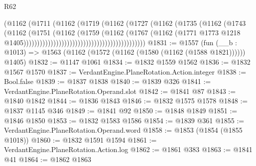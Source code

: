 \begin{lexlean}{R62}
\begin{coremodule}
                                                          (@1162
                                                            (@1711
                                                              (@1162
                                                                (@1719
                                                                  (@1162
                                                                    (@1727
                                                                      (@1162
                                                                        (@1735
                                                                          (@1162
                                                                            (@1743
                                                                              (@1162
                                                                                (@1751
                                                                                  (@1162
                                                                                    (@1759
                                                                                      (@1162
                                                                                        (@1767
                                                                                          (@1162
                                                                                            (@1771
                                                                                              @1773
                                                                                              @1218
                                                                                              @1405)))))))))))))))))))))))))))))))))))))))))))))
@1831 := @1557
    (fun (__b : @1013) => @1563 (@1162 (@1572 (@1162 (@1580 (@1162 (@1588 @1821)))))) @1405)
@1832 := @1147 @1061
@1834 := @1832 @1559 @1562
@1836 := @1832 @1567 @1570
@1837 := VerdantEngine.PlaneRotation.Action.integer
@1838 := Bool.false
@1839 := @1837 @1838
@1840 := @1839 @326
@1841 := VerdantEngine.PlaneRotation.Operand.slot
@1842 := @1841 @87
@1843 := @1840 @1842
@1844 := @1836 @1843
@1846 := @1832 @1575 @1578
@1848 := @1837 @1145 @346
@1849 := @1841 @92
@1850 := @1848 @1849
@1851 := @1846 @1850
@1853 := @1832 @1583 @1586
@1854 := @1839 @361
@1855 := VerdantEngine.PlaneRotation.Operand.word
@1858 := @1853 (@1854 (@1855 @1018))
@1860 := @1832 @1591 @1594
@1861 := VerdantEngine.PlaneRotation.Action.log
@1862 := @1861 @383
@1863 := @1841 @41
@1864 := @1862 @1863

\end{coremodule}
\end{lexlean}
